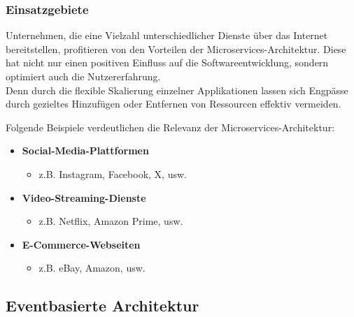 
        \subsubsection{Einsatzgebiete}

        Unternehmen, die eine Vielzahl unterschiedlicher Dienste über das Internet bereitstellen, profitieren von den Vorteilen der Microservices-Architektur. Diese hat nicht nur einen positiven Einfluss auf die Softwareentwicklung, sondern optimiert auch die Nutzererfahrung. \\
        Denn durch die flexible Skalierung einzelner Applikationen lassen sich Engpässe durch gezieltes Hinzufügen oder Entfernen von Ressourcen effektiv vermeiden.
        \cite{EA:Web62}

        Folgende Beispiele verdeutlichen die Relevanz der Microservices-Architektur:
        \begin{itemize}
            \item \textbf{Social-Media-Plattformen}
            \begin{itemize}[label=$\circ$]
                \item z.B. Instagram, Facebook, X, usw.
            \end{itemize}

            \item \textbf{Video-Streaming-Dienste} 
            \begin{itemize}[label=$\circ$]
                \item z.B. Netflix, Amazon Prime, usw.
            \end{itemize}
            
            \item \textbf{E-Commerce-Webseiten}
            \begin{itemize}[label=$\circ$]
                \item z.B. eBay, Amazon, usw.
            \end{itemize}
        \end{itemize}


    
    \subsection{Eventbasierte Architektur} \label{Eventbasierte Architektur}

